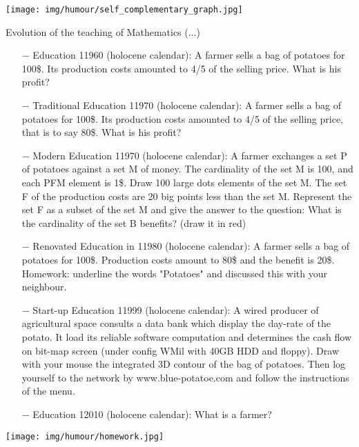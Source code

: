 	\begin{center}
		\texttt{[image: img/humour/self\_complementary\_graph.jpg]}	
	\end{center}
	
	\pagebreak
Evolution of the teaching of Mathematics (...)

\begin{itemize}	 
	\item[$-$] Education 11960 (holocene calendar): A farmer sells a bag of potatoes for 100\$. Its production costs amounted to 4/5 of the selling price. What is his profit?

	\item[$-$] Traditional Education 11970 (holocene calendar): A farmer sells a bag of potatoes for 100\$. Its production costs amounted to 4/5 of the selling price, that is to say 80\$. What is his profit?

	\item[$-$] Modern Education 11970 (holocene calendar): A farmer exchanges a set P of potatoes against a set M of money. The cardinality of the set M is 100, and each PFM element is 1\$. Draw 100 large dots elements of the set M. The set F of the production costs are 20 big points less than the set M. Represent the set F as a subset of the set M and give the answer to the question: What is the cardinality of the set B benefits? (draw it in red)

	\item[$-$] Renovated Education in 11980 (holocene calendar): A farmer sells a bag of potatoes for 100\$. Production costs amount to 80\$ and the benefit is 20\$. Homework: underline the words "Potatoes" and discussed this with your neighbour.

	\item[$-$] Start-up Education 11999 (holocene calendar): A wired producer of agricultural space consults a data bank which display the day-rate of the potato. It load its reliable software computation and determines the cash flow on bit-map screen (under config WMil with 40GB HDD and floppy). Draw with your mouse the integrated 3D contour of the bag of potatoes. Then log yourself to the network by www.blue-potatoe.com and follow the instructions of the menu.

	\item[$-$] Education 12010 (holocene calendar): What is a farmer?
\end{itemize}
	\begin{center}\underline{\hspace{5 cm}}\end{center}
	\begin{center}
		\texttt{[image: img/humour/homework.jpg]}	
	\end{center}

